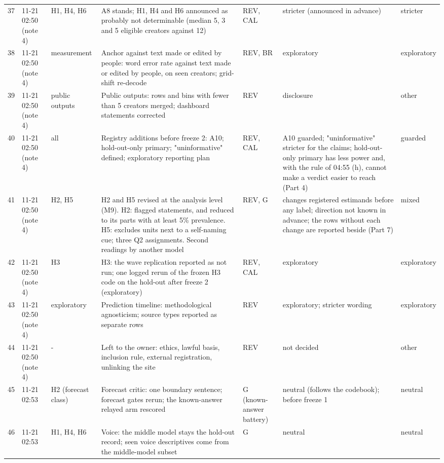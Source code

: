 {\begin{tabular}{@{}rp{}p{}p{}p{}p{}l@{}}
37 & 11-21 02:50 (note 4) & H1, H4, H6 & A8 stands; H1, H4 and H6 announced as probably not determinable (median 5, 3 and 5 eligible creators against 12) & REV, CAL & stricter (announced in advance) & stricter \\
38 & 11-21 02:50 (note 4) & measurement & Anchor against text made or edited by people: word error rate against text made or edited by people, on seen creators; grid-shift re-decode & REV, BR & exploratory & exploratory \\
39 & 11-21 02:50 (note 4) & public outputs & Public outputs: rows and bins with fewer than 5 creators merged; dashboard statements corrected & REV & disclosure & other \\
40 & 11-21 02:50 (note 4) & all & Registry additions before freeze 2: A10; hold-out-only primary; "uninformative" defined; exploratory reporting plan & REV, CAL & A10 guarded; "uninformative" stricter for the claims; hold-out-only primary has less power and, with the rule of 04:55 (h), cannot make a verdict easier to reach (Part 4) & guarded \\
41 & 11-21 02:50 (note 4) & H2, H5 & H2 and H5 revised at the analysis level (M9). H2: flagged statements, and reduced to its parts with at least 5\% prevalence. H5: excludes units next to a self-naming cue; three Q2 assignments. Second readings by another model & REV, G & changes registered estimands before any label; direction not known in advance; the rows without each change are reported beside (Part 7) & mixed \\
42 & 11-21 02:50 (note 4) & H3 & H3: the wave replication reported as not run; one logged rerun of the frozen H3 code on the hold-out after freeze 2 (exploratory) & REV, CAL & exploratory & exploratory \\
43 & 11-21 02:50 (note 4) & exploratory & Prediction timeline: methodological agnosticism; source types reported as separate rows & REV & exploratory; stricter wording & exploratory \\
44 & 11-21 02:50 (note 4) & - & Left to the owner: ethics, lawful basis, inclusion rule, external registration, unlinking the site & REV & not decided & other \\
45 & 11-21 02:53 & H2 (forecast class) & Forecast critic: one boundary sentence; forecast gates rerun; the known-answer relayed arm rescored & G (known-answer battery) & neutral (follows the codebook); before freeze 1 & neutral \\
46 & 11-21 02:53 & H1, H4, H6 & Voice: the middle model stays the hold-out record; seen voice descriptives come from the middle-model subset & G & neutral & neutral \\

\end{tabular}}
